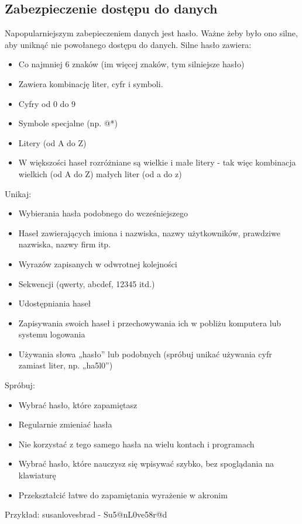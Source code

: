 \documentclass[12pt,a4paper]{article}
\begin{document}
\subsection{Zabezpieczenie dostępu do danych }

Napopularniejszym zabepieczeniem danych jest hasło. Ważne żeby było ono silne, aby uniknąć nie powołanego dostępu do danych.
Silne hasło zawiera: 
\begin{itemize}
\item Co najmniej 6 znaków (im więcej znaków, tym silniejsze hasło) 
\item Zawiera kombinację liter, cyfr i symboli. 
\item Cyfry od 0 do 9 
\item Symbole specjalne (np. @*)
\item Litery (od A do Z) 
\item W większości haseł rozróżniane są wielkie i małe litery - tak więc kombinacja wielkich (od A do Z) małych liter (od a do z) 
\end{itemize}
Unikaj: 
\begin{itemize}
\item Wybierania hasła podobnego do wcześniejszego    
\item Haseł zawierających imiona i nazwiska, nazwy użytkowników, prawdziwe nazwiska, nazwy firm itp.    
\item Wyrazów zapisanych w odwrotnej kolejności    
\item Sekwencji (qwerty, abcdef, 12345 itd.)    
\item Udostępniania haseł    
\item Zapisywania swoich haseł i przechowywania ich w pobliżu komputera lub systemu logowania    
\item Używania słowa „hasło” lub podobnych (spróbuj unikać używania cyfr zamiast liter, np. „ha5l0”) 
\end{itemize}
Spróbuj: 
\begin{itemize}
\item Wybrać hasło, które zapamiętasz    
\item Regularnie zmieniać hasła    
\item Nie korzystać z tego samego hasła na wielu kontach i programach    
\item Wybrać hasło, które nauczysz się wpisywać szybko, bez spoglądania na klawiaturę    
\item Przekształcić łatwe do zapamiętania wyrażenie w akronim  
\end{itemize}
Przykład: susanlovesbrad - Su5@nL0ve58r@d 
\end{document}
